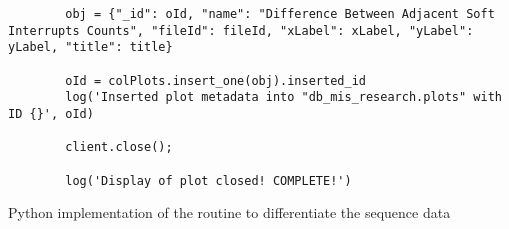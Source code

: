 \begin{code}
\begin{verbatim}
    	obj = {"_id": oId, "name": "Difference Between Adjacent Soft Interrupts Counts", "fileId": fileId, "xLabel": xLabel, "yLabel": yLabel, "title": title}
    
    	oId = colPlots.insert_one(obj).inserted_id
    	log('Inserted plot metadata into "db_mis_research.plots" with ID {}', oId)
    
    	client.close();
    
    	log('Display of plot closed! COMPLETE!')
    \end{verbatim}
    \caption{Python implementation of the routine to differentiate the sequence data}
    \label{lst:py_class_float}
\end{code}